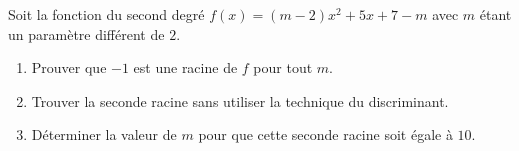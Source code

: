 
\begin{exercice}\label{exoPremiere-0045}

    Soit la fonction du second degré \( f(x)=(m-2)x^2+5x+7-m\) avec \( m\) étant un paramètre différent de \( 2\).
    \begin{enumerate}
        \item
            Prouver que \( -1\) est une racine de \( f\) pour tout \( m\).
        \item
            Trouver la seconde racine sans utiliser la technique du discriminant.
        \item
            Déterminer la valeur de \( m\) pour que cette seconde racine soit égale à \( 10\).
    \end{enumerate}
{}
\end{exercice}
